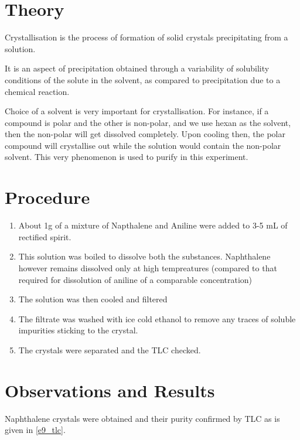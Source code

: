 
\section{Theory}
	Crystallisation is the process of formation of solid crystals precipitating from a solution.
	\par
	It is an aspect of precipitation obtained through a variability of solubility conditions of the solute in the solvent, as compared to precipitation due to a chemical reaction.
	\par
	Choice of a solvent is very important for crystallisation. For instance, if a compound is polar and the other is non-polar, and we use hexan as the solvent, then the non-polar will get dissolved completely. Upon cooling then, the polar compound will crystallise out while the solution would contain the non-polar solvent. This very phenomenon is used to purify in this experiment.

\section{Procedure}
	\begin{enumerate}
		\item About 1g of a mixture of Napthalene and Aniline were added to 3-5 mL of rectified spirit.
		\item This solution was boiled to dissolve both the substances. Naphthalene however remains dissolved only at high tempreatures (compared to that required for dissolution of aniline of a comparable concentration)
		\item The solution was then cooled and filtered
		\item The filtrate was washed with ice cold ethanol to remove any traces of soluble impurities sticking to the crystal.
		\item The crystals were separated and the TLC checked.
	\end{enumerate}

\section{Observations and Results}
	Naphthalene crystals were obtained and their purity confirmed by TLC as is given in \autoref{e9_tlc}.	

